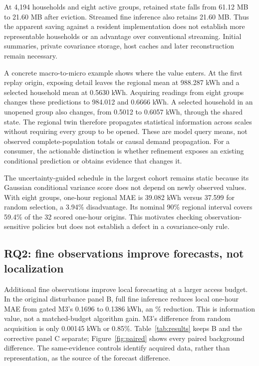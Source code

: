 \documentclass[conference]{IEEEtran}
\begin{document}
At 4,194 households and eight active groups, retained state falls from 61.12 MB to 21.60 MB after eviction. Streamed fine inference also retains 21.60 MB. Thus the apparent saving against a resident implementation does not establish more representable households or an advantage over conventional streaming. Initial summaries, private covariance storage, host caches and later reconstruction remain necessary.

A concrete macro-to-micro example shows where the value enters. At the first replay origin, exposing detail leaves the regional mean at 988.287 kWh and a selected household mean at 0.5630 kWh. Acquiring readings from eight groups changes these predictions to 984.012 and 0.6666 kWh. A selected household in an unopened group also changes, from 0.5012 to 0.6057 kWh, through the shared state. The regional twin therefore propagates statistical information across scales without requiring every group to be opened. These are model query means, not observed complete-population totals or causal demand propagation. For a consumer, the actionable distinction is whether refinement exposes an existing conditional prediction or obtains evidence that changes it.

The uncertainty-guided schedule in the largest cohort remains static because its Gaussian conditional variance score does not depend on newly observed values. With eight groups, one-hour regional MAE is 39.082 kWh versus 37.599 for random selection, a 3.94\% disadvantage. Its nominal 90\% regional interval covers 59.4\% of the 32 scored one-hour origins. This motivates checking observation-sensitive policies but does not establish a defect in a covariance-only rule.

\subsection{RQ2: fine observations improve forecasts, not localization}
Additional fine observations improve local forecasting at a larger access budget. In the original disturbance panel B, full fine inference reduces local one-hour MAE from gated M3's 0.1696 to 0.1386 kWh, an \FineGainPercent{}\% reduction. This is information value, not a matched-budget algorithm gain. M3's difference from random acquisition is only 0.00145 kWh or 0.85\%. Table~\ref{tab:results} keeps B and the corrective panel C separate; Figure~\ref{fig:paired} shows every paired background difference. The same-evidence controls identify acquired data, rather than representation, as the source of the forecast difference.
\end{document}
